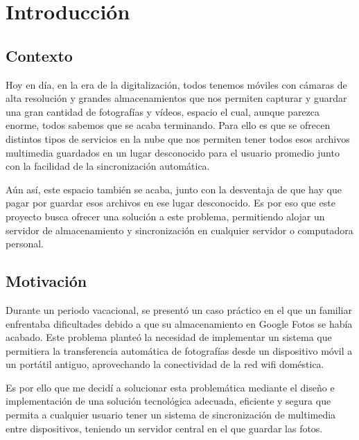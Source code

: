 \section{Introducción}

\subsection{Contexto}
Hoy en día, en la era de la digitalización, todos tenemos móviles con cámaras de alta resolución y grandes almacenamientos que nos permiten capturar y guardar una gran cantidad de fotografías y vídeos, espacio el cual, aunque parezca enorme, todos sabemos que se acaba terminando. Para ello es que se ofrecen distintos tipos de servicios en la nube que nos permiten tener todos esos archivos multimedia guardados en un lugar desconocido para el usuario promedio junto con la facilidad de la sincronización automática.

Aún así, este espacio también se acaba, junto con la desventaja de que hay que pagar por guardar esos archivos en ese lugar desconocido. Es por eso que este proyecto busca ofrecer una solución a este problema, permitiendo alojar un servidor de almacenamiento y sincronización en cualquier servidor o computadora personal.

\subsection{Motivación}
Durante un periodo vacacional, se presentó un caso práctico en el que un familiar enfrentaba dificultades debido a que su almacenamiento en Google Fotos se había acabado. Este problema planteó la necesidad de implementar un sistema que permitiera la transferencia automática de fotografías desde un dispositivo móvil a un portátil antiguo, aprovechando la conectividad de la red wifi doméstica.

Es por ello que me decidí a solucionar esta problemática mediante el diseño e implementación de una solución tecnológica adecuada, eficiente y segura que permita a cualquier usuario tener un sistema de sincronización de multimedia entre dispositivos, teniendo un servidor central en el que guardar las fotos.
